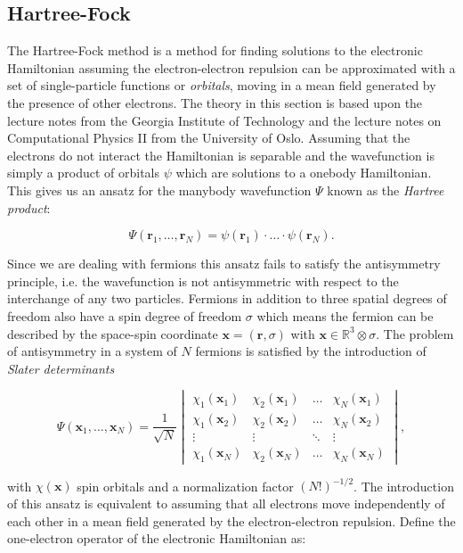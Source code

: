 \subsection{Hartree-Fock}
The Hartree-Fock method is a method for finding
solutions to the electronic Hamiltonian assuming
the electron-electron repulsion can be approximated
with a set of single-particle functions or \textit{orbitals},
moving in a mean field generated by the presence of other electrons.
The theory in this section is based upon the \parencite[Sherrill]
{sherrill2000} lecture notes from the Georgia Institute of Technology
and the lecture notes
on Computational Physics II \parencite[Hjorth-Jensen]
{hjensen2019} from the University of Oslo.
Assuming that the electrons do not interact
the Hamiltonian is separable and the wavefunction
is simply a product of orbitals $\psi$
which are solutions to a onebody Hamiltonian.
This gives us an ansatz for the manybody wavefunction $\Psi$
known as the \textit{Hartree product}:

$$ \Psi(\bm{r}_1,\dots,\bm{r}_N) = \psi(\bm{r}_1) \cdot \dots
    \cdot \psi(\bm{r}_N) . $$

Since we are dealing with fermions this ansatz fails to satisfy
the antisymmetry principle, i.e. the wavefunction
is not antisymmetric with respect to the interchange of any two
particles. Fermions in addition to three spatial degrees of freedom
also have a spin degree of freedom $\sigma$
which means the fermion can be described
by the space-spin coordinate $\bm{x} = (\bm{r}, \sigma)$
with $\bm{x} \in \mathbb{R}^3 \otimes \sigma$.
The problem of antisymmetry in a system of $N$ fermions
is satisfied by the introduction of \textit{Slater determinants}

\begin{equation}
\Psi(\bm{x}_1,\dots,\bm{x}_N)
= \frac{1}{\sqrt{N}}
\begin{vmatrix}
    \chi_{1}(\bm{x}_1) & \chi_{2}(\bm{x}_1)
    & \dots & \chi_{N}(\bm{x}_1) \\
    \chi_{1}(\bm{x}_2)  & \chi_{2}(\bm{x}_2)
    & \dots & \chi_{N}(\bm{x}_2) \\
    \vdots & \vdots & \ddots & \vdots \\
    \chi_{1}(\bm{x}_N) & \chi_{2}(\bm{x}_N)
    & \dots & \chi_{N}(\bm{x}_N)
\end{vmatrix} ,
\end{equation}

with $\chi(\bm{x})$ spin orbitals and a normalization factor
$(N!)^{-1/2}$. The introduction of this ansatz is equivalent to assuming that
all electrons move independently of each other
in a mean field generated by the electron-electron repulsion.
Define the one-electron operator of the electronic Hamiltonian as:

